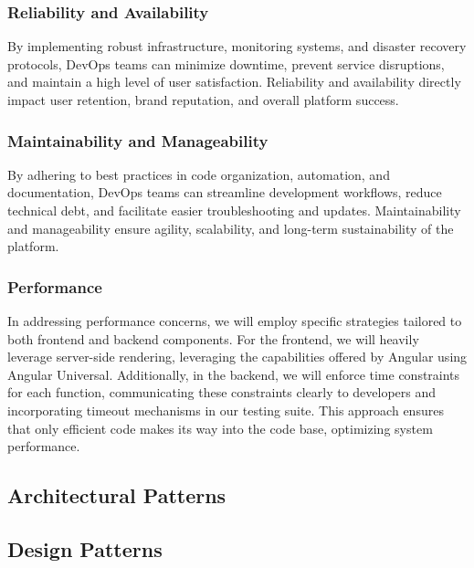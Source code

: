 \documentclass[a4paper,12pt]{article}
\begin{document}
\subsubsection{Reliability and Availability}
By implementing robust infrastructure, monitoring systems, and disaster recovery protocols, DevOps teams 
can minimize downtime, prevent service disruptions, and maintain a high level of user satisfaction. Reliability 
and availability directly impact user retention, brand reputation, and overall platform success.

\subsubsection{Maintainability and Manageability}
By adhering to best practices in code organization, automation, and documentation, DevOps teams can streamline 
development workflows, reduce technical debt, and facilitate easier troubleshooting and updates. Maintainability 
and manageability ensure agility, scalability, and long-term sustainability of the platform.

\subsubsection{Performance}
In addressing performance concerns, we will employ specific strategies tailored to both frontend and backend 
components. For the frontend, we will heavily leverage server-side rendering, leveraging the capabilities 
offered by Angular using Angular Universal. Additionally, in the backend, we will enforce time constraints 
for each function, communicating these constraints clearly to developers and incorporating timeout mechanisms 
in our testing suite. This approach ensures that only efficient code makes its way into the code base, optimizing 
system performance.


\subsection{Architectural Patterns}
\label{subsec:architectural-patterns}

\subsection{Design Patterns}
\label{subsec:design-patterns}
\end{document}
